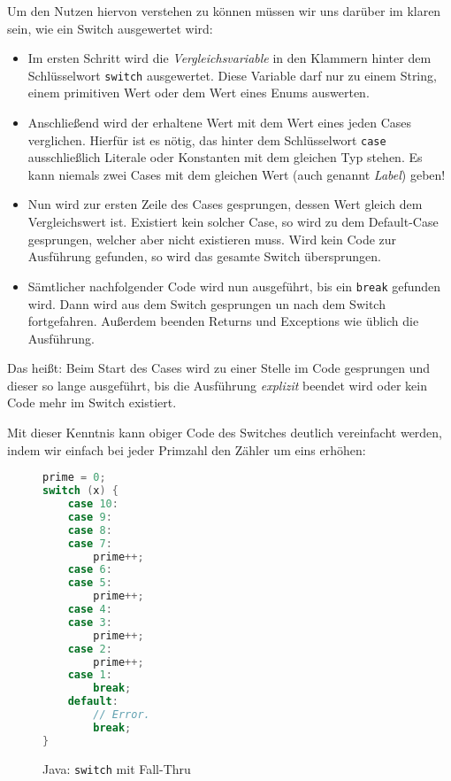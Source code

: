 		Um den Nutzen hiervon verstehen zu können müssen wir uns darüber im klaren sein, wie ein Switch ausgewertet wird:
		\begin{itemize}
			\item Im ersten Schritt wird die \textit{Vergleichsvariable} in den Klammern hinter dem Schlüsselwort \texttt{switch} ausgewertet. Diese Variable darf nur zu einem String, einem primitiven Wert oder dem Wert eines Enums auswerten.
			\item Anschließend wird der erhaltene Wert mit dem Wert eines jeden Cases verglichen. Hierfür ist es nötig, das hinter dem Schlüsselwort \texttt{case} ausschließlich Literale oder Konstanten mit dem gleichen Typ stehen. Es kann niemals zwei Cases mit dem gleichen Wert (auch genannt \textit{Label}) geben!
			\item Nun wird zur ersten Zeile des Cases gesprungen, dessen Wert gleich dem Vergleichswert ist. Existiert kein solcher Case, so wird zu dem Default-Case gesprungen, welcher aber nicht existieren muss. Wird kein Code zur Ausführung gefunden, so wird das gesamte Switch übersprungen.
			\item Sämtlicher nachfolgender Code wird nun ausgeführt, bis ein \texttt{break} gefunden wird. Dann wird aus dem Switch gesprungen un nach dem Switch fortgefahren. Außerdem beenden Returns und Exceptions wie üblich die Ausführung.
		\end{itemize}
		
		Das heißt: Beim Start des Cases wird zu einer Stelle im Code gesprungen und dieser so lange ausgeführt, bis die Ausführung \textit{explizit} beendet wird oder kein Code mehr im Switch existiert.
		
		Mit dieser Kenntnis kann obiger Code des Switches deutlich vereinfacht werden, indem wir einfach bei jeder Primzahl den Zähler um eins erhöhen:
		\begin{figure}[H]
			\centering
			\begin{lstlisting}[language = Java]
prime = 0;
switch (x) {
	case 10:
	case 9:
	case 8:
	case 7:
		prime++;
	case 6:
	case 5:
		prime++;
	case 4:
	case 3:
		prime++;
	case 2:
		prime++;
	case 1:
		break;
	default:
		// Error.
		break;
}
			\end{lstlisting}
			\caption{Java: \texttt{switch} mit Fall-Thru}
		\end{figure}
		


